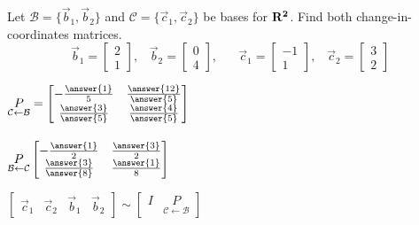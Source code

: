 \documentclass{ximera}
\newcommand{\RR}{\bf R}
\begin{document}
  	  		     \begin{question} Let $\mathcal{B} =\{\vec{b}_1,\vec{b}_2\}$ and $\mathcal{C} =\{\vec{c}_1,\vec{c}_2\}$ be bases for $\RR^2$. Find both change-in-coordinates matrices.
  	  		     	$$\vec{b}_1 = \begin{bmatrix} 2 \\1\end{bmatrix}, \hspace{10pt} \vec{b}_2 = \begin{bmatrix}0 \\4\end{bmatrix}, \hspace{20pt} \vec{c}_1 = \begin{bmatrix} -1 \\1\end{bmatrix}, \hspace{10pt} \vec{c}_2 = \begin{bmatrix} 3 \\2\end{bmatrix}$$
  	  		     
  	  		     	$\underset{\mathcal{C}\leftarrow \mathcal{B}}{P}=\begin{bmatrix}
  	  		     	-\frac{\answer{1}}{5} &\frac{\answer{12}}{\answer{5}} \\
  	  		     	\frac{\answer{3}}{\answer{5}} & \frac{\answer{4}}{\answer{5}}
  	  		     	\end{bmatrix}$\\\vspace{10pt}\\
  	  		     	$\underset{\mathcal{B}\leftarrow \mathcal{C}}{P}\begin{bmatrix}
  	  		     	-\frac{\answer{1}}{2} &\frac{\answer{3}}{2} \\
  	  		     	\frac{\answer{3}}{\answer{8}} & \frac{\answer{1}}{8}
  	  		     	\end{bmatrix}$\\
  	  		     	
  	  		     	\begin{hint}
  	  		     		$\begin{bmatrix}\vec{c}_1& \vec{c}_2 &\vec{b}_1 &\vec{b}_2\end{bmatrix} \sim \begin{bmatrix} I & \underset{\mathcal{C}\leftarrow \mathcal{B}}{P} \end{bmatrix}$
  	  		     		\end{hint}
  	  		     \end{question}
  	  		    
  	  		    
  	  		    
  	  		    
  
\end{document}
